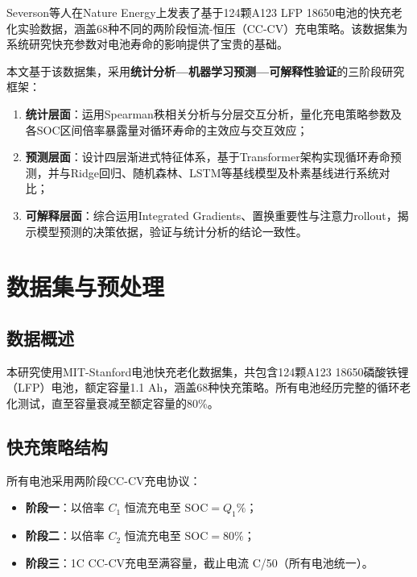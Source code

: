 \documentclass[12pt,a4paper]{ctexart}
\begin{document}
Severson等人\cite{severson2019}在Nature Energy上发表了基于124颗A123 LFP 18650电池的快充老化实验数据，涵盖68种不同的两阶段恒流-恒压（CC-CV）充电策略。该数据集为系统研究快充参数对电池寿命的影响提供了宝贵的基础。

本文基于该数据集，采用\textbf{统计分析—机器学习预测—可解释性验证}的三阶段研究框架：

\begin{enumerate}[label=(\arabic*), leftmargin=*]
    \item \textbf{统计层面}：运用Spearman秩相关分析与分层交互分析，量化充电策略参数及各SOC区间倍率暴露量对循环寿命的主效应与交互效应；
    \item \textbf{预测层面}：设计四层渐进式特征体系，基于Transformer架构实现循环寿命预测，并与Ridge回归、随机森林、LSTM等基线模型及朴素基线进行系统对比；
    \item \textbf{可解释层面}：综合运用Integrated Gradients、置换重要性与注意力rollout，揭示模型预测的决策依据，验证与统计分析的结论一致性。
\end{enumerate}

\section{数据集与预处理}

\subsection{数据概述}

本研究使用MIT-Stanford电池快充老化数据集\cite{severson2019}，共包含124颗A123 18650磷酸铁锂（LFP）电池，额定容量1.1 Ah，涵盖68种快充策略。所有电池经历完整的循环老化测试，直至容量衰减至额定容量的80\%。

\subsection{快充策略结构}

所有电池采用两阶段CC-CV充电协议：

\begin{itemize}[leftmargin=*]
    \item \textbf{阶段一}：以倍率 $C_1$ 恒流充电至 $\text{SOC} = Q_1\%$；
    \item \textbf{阶段二}：以倍率 $C_2$ 恒流充电至 $\text{SOC} = 80\%$；
    \item \textbf{阶段三}：1C CC-CV充电至满容量，截止电流 C/50（所有电池统一）。
\end{itemize}
\end{document}

